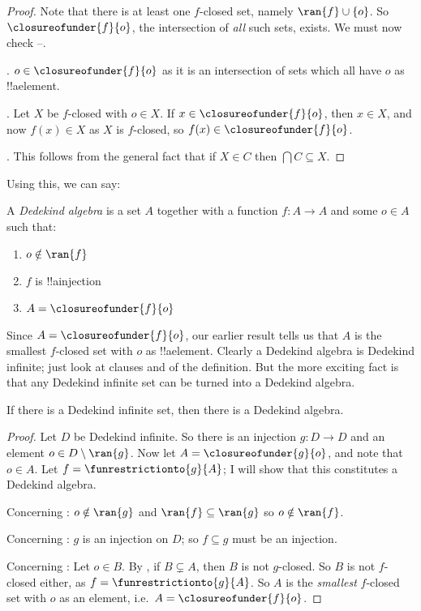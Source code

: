\documentclass[../../../include/open-logic-section]{subfiles}
\begin{document}
\begin{proof}
		Note that there is at least one $f$-closed set, namely $\ran{f}\cup \{o\}$. So $\closureofunder{f}{o}$, the intersection of \emph{all} such sets, exists. We must now check --.
						
		. $o \in \closureofunder{f}{o}$ as it is an intersection of sets which all have $o$ as !!a{element}. 
			
		. Let $X$ be $f$-closed with $o \in X$. If $x \in \closureofunder{f}{o}$, then $x \in X$, and now $f(x) \in X$ as $X$ is $f$-closed, so $f(x) \in \closureofunder{f}{o}$.
			
		. This follows from the general fact that if $X \in C$ then $\bigcap C \subseteq X$.
\end{proof}\noindent
Using this, we can say:
\begin{defn}
	A \emph{Dedekind algebra} is a set $A$ together with a function $f \colon A \to A$ and some $o \in A$  such that:
	\begin{enumerate}
		\item {} $o \notin \ran{f}$
		\item {} $f$ is !!a{injection}
		\item {} $A = \closureofunder{f}{o}$
	\end{enumerate}
\end{defn}\noindent
Since $A = \closureofunder{f}{o}$, our earlier result tells us that $A$ is the smallest $f$-closed set with $o$ as !!a{element}. Clearly a Dedekind algebra is Dedekind infinite; just look at clauses  and  of the definition. But the more exciting fact is that any Dedekind infinite set can be turned into a Dedekind algebra. 
\begin{thm}
	If there is a Dedekind infinite set, then there is a Dedekind algebra.
\end{thm}
	\begin{proof}
		Let $D$ be Dedekind infinite. So there is an injection $g \colon D \to D$ and an element $o  \in D \setminus \ran{g}$. Now let $A = \closureofunder{g}{o}$, and note that $o \in A$. Let $f = \funrestrictionto{g}{A}$; I will show that this constitutes a Dedekind algebra. 
	
		Concerning : $o \notin \ran{g}$ and $\ran{f} \subseteq \ran{g}$ so $o\notin \ran{f}$.
			
		Concerning : $g$ is an injection on $D$; so $f \subseteq g$ must be an injection.
		
		Concerning : Let $o \in B$. By , if $B \subsetneq A$, then $B$ is not $g$-closed. So $B$ is not $f$-closed either, as $f = \funrestrictionto{g}{A}$. So $A$ is the \emph{smallest} $f$-closed set with $o$ as an element, i.e.\ $A = \closureofunder{f}{o}$.
	\end{proof}
\end{document}
